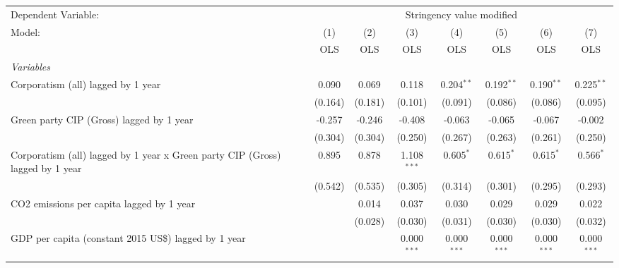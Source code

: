 
\begingroup
\centering
\begin{tabular}{lccccccc}
   \toprule
   Dependent Variable: & \multicolumn{7}{c}{Stringency value modified}\\
   Model:                                                                        & (1)     & (2)     & (3)           & (4)           & (5)           & (6)           & (7)\\  
                                                                                 &  OLS    & OLS     & OLS           & OLS           & OLS           & OLS           & OLS\\  
   \midrule
   \emph{Variables}\\
   Corporatism (all) lagged by 1 year                                            & 0.090   & 0.069   & 0.118         & 0.204$^{**}$  & 0.192$^{**}$  & 0.190$^{**}$  & 0.225$^{**}$\\   
                                                                                 & (0.164) & (0.181) & (0.101)       & (0.091)       & (0.086)       & (0.086)       & (0.095)\\   
   Green party CIP (Gross) lagged by 1 year                                      & -0.257  & -0.246  & -0.408        & -0.063        & -0.065        & -0.067        & -0.002\\   
                                                                                 & (0.304) & (0.304) & (0.250)       & (0.267)       & (0.263)       & (0.261)       & (0.250)\\   
   Corporatism (all) lagged by 1 year x Green party CIP (Gross) lagged by 1 year & 0.895   & 0.878   & 1.108$^{***}$ & 0.605$^{*}$   & 0.615$^{*}$   & 0.615$^{*}$   & 0.566$^{*}$\\   
                                                                                 & (0.542) & (0.535) & (0.305)       & (0.314)       & (0.301)       & (0.295)       & (0.293)\\   
   CO2 emissions per capita lagged by 1 year                                     &         & 0.014   & 0.037         & 0.030         & 0.029         & 0.029         & 0.022\\   
                                                                                 &         & (0.028) & (0.030)       & (0.031)       & (0.030)       & (0.030)       & (0.032)\\   
   GDP per capita (constant 2015 US\$) lagged by 1 year                          &         &         & 0.000$^{***}$ & 0.000$^{***}$ & 0.000$^{***}$ & 0.000$^{***}$ & 0.000$^{***}$\\   

\end{tabular}
